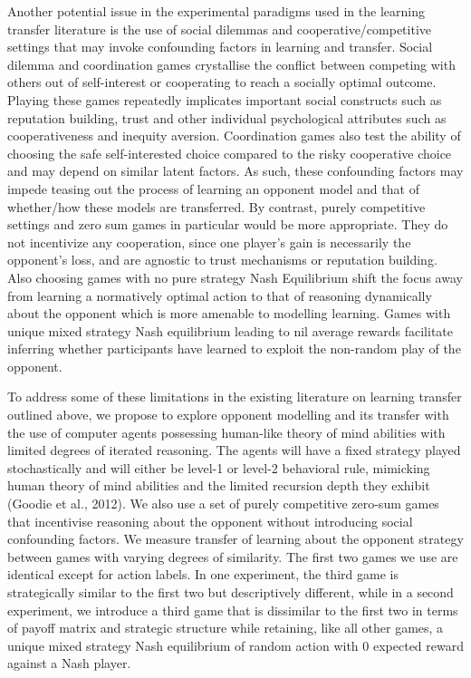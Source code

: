 \documentclass[man,floatsintext]{apa6}
\begin{document}
Another potential issue in the experimental paradigms used in the learning transfer literature is the use of social dilemmas and cooperative/competitive settings that may invoke confounding factors in learning and transfer. Social dilemma and coordination games crystallise the conflict between competing with others out of self-interest or cooperating to reach a socially optimal outcome. Playing these games repeatedly implicates important social constructs such as reputation building, trust and other individual psychological attributes such as cooperativeness and inequity aversion. Coordination games also test the ability of choosing the safe self-interested choice compared to the risky cooperative choice and may depend on similar latent factors. As such, these confounding factors may impede teasing out the process of learning an opponent model and that of whether/how these models are transferred. By contrast, purely competitive settings and zero sum games in particular would be more appropriate. They do not incentivize any cooperation, since one player's gain is necessarily the opponent's loss, and are agnostic to trust mechanisms or reputation building. Also choosing games with no pure strategy Nash Equilibrium shift the focus away from learning a normatively optimal action to that of reasoning dynamically about the opponent which is more amenable to modelling learning. Games with unique mixed strategy Nash equilibrium leading to nil average rewards facilitate inferring whether participants have learned to exploit the non-random play of the opponent.

To address some of these limitations in the existing literature on learning transfer outlined above, we propose to explore opponent modelling and its transfer with the use of computer agents possessing human-like theory of mind abilities with limited degrees of iterated reasoning. The agents will have a fixed strategy played stochastically and will either be level-1 or level-2 behavioral rule, mimicking human theory of mind abilities and the limited recursion depth they exhibit (Goodie et al., 2012). We also use a set of purely competitive zero-sum games that incentivise reasoning about the opponent without introducing social confounding factors. We measure transfer of learning about the opponent strategy between games with varying degrees of similarity. The first two games we use are identical except for action labels. In one experiment, the third game is strategically similar to the first two but descriptively different, while in a second experiment, we introduce a third game that is dissimilar to the first two in terms of payoff matrix and strategic structure while retaining, like all other games, a unique mixed strategy Nash equilibrium of random action with 0 expected reward against a Nash player.
\end{document}

